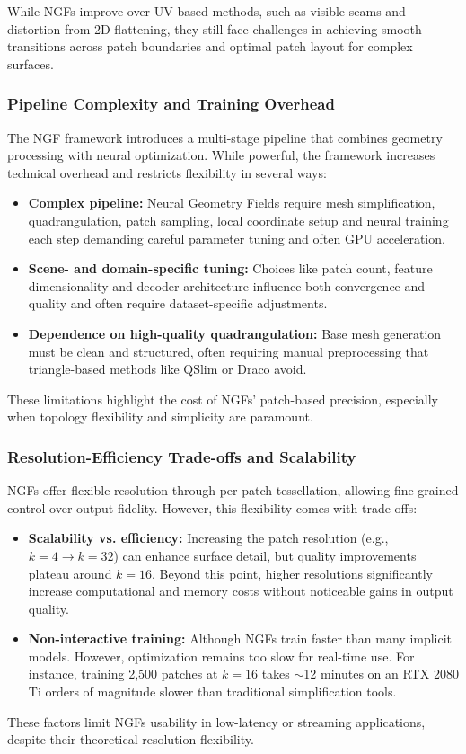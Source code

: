 While NGFs improve over UV-based methods, such as visible seams and distortion from 2D flattening, they still face challenges in achieving smooth transitions across patch boundaries and optimal patch layout for complex surfaces.

\subsubsection{Pipeline Complexity and Training Overhead}

The NGF framework introduces a multi-stage pipeline that combines geometry processing with neural optimization. 
While powerful, the framework increases technical overhead and restricts flexibility in several ways: 

\begin{itemize}
    \item \textbf{Complex pipeline:} Neural Geometry Fields require mesh simplification, quadrangulation, patch sampling, local coordinate setup and neural training each step demanding careful parameter tuning and often GPU acceleration.
    \item \textbf{Scene- and domain-specific tuning:} Choices like patch count, feature dimensionality and decoder architecture influence both convergence and quality and often require dataset-specific adjustments.
    \item \textbf{Dependence on high-quality quadrangulation:} Base mesh generation must be clean and structured, often requiring manual preprocessing that triangle-based methods like QSlim or Draco avoid.
\end{itemize}

These limitations highlight the cost of NGFs' patch-based precision, especially when topology flexibility and simplicity are paramount. 

\subsubsection{Resolution-Efficiency Trade-offs and Scalability}

NGFs offer flexible resolution through per-patch tessellation, allowing fine-grained control over output fidelity. 
However, this flexibility comes with trade-offs: 

\begin{itemize}
    \item \textbf{Scalability vs. efficiency:} Increasing the patch resolution (e.g., $k = 4 \rightarrow k = 32$) can enhance surface detail, but quality improvements plateau around $k = 16$. Beyond this point, higher resolutions significantly increase computational and memory costs without noticeable gains in output quality.
    \item \textbf{Non-interactive training:} Although NGFs train faster than many implicit models. However, optimization remains too slow for real-time use. For instance, training 2,500 patches at $k = 16$ takes $\sim$12 minutes on an RTX 2080 Ti orders of magnitude slower than traditional simplification tools.
\end{itemize}

These factors limit NGFs usability in low-latency or streaming applications, despite their theoretical resolution flexibility. 
